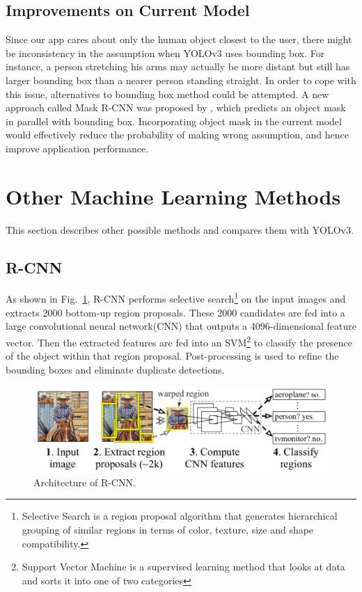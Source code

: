 \documentclass[letterpaper]{article} %
\begin{document}
\subsection{Improvements on Current Model}
Since our app cares about only the human object closest to the user, there might be inconsistency in the assumption when YOLOv3 uses bounding box. For instance, a person stretching his arms may actually be more distant but still has larger bounding box than a nearer person standing straight. In order to cope with this issue, alternatives to bounding box method could be attempted. A new approach called Mask R-CNN was proposed by \cite{Mask-RCNN}, which predicts an object mask in parallel with bounding box. Incorporating object mask in the current model would effectively reduce the probability of making wrong assumption, and hence improve application performance.

\section{Other Machine Learning Methods}
This section describes other possible methods and compares them with YOLOv3.

\subsection{R-CNN}
As shown in Fig.~\ref{fig:r_cnn}, R-CNN performs selective search\footnote{Selective Search is a region proposal algorithm that generates hierarchical grouping of similar regions in terms of color, texture, size and shape compatibility.} on the input images and extracts 2000 bottom-up region proposals. These 2000 candidates are fed into a large convolutional neural network(CNN) that outputs a 4096-dimensional feature vector. Then the extracted features are fed into an SVM\footnote{Support Vector Machine is a supervised learning method that looks at data and sorts it into one of two categories} to classify the presence of the object within that region proposal. Post-processing is used to refine the bounding boxes and eliminate duplicate detections.\\
\begin{figure}[ht]
\hspace{0mm}
\centering
\includegraphics[scale = 0.23]{Figure/r_cnn.png}
\caption{\footnotesize{Architecture of R-CNN.}}
\label{fig:r_cnn}
\vspace{0mm}
\end{figure}
\end{document}

